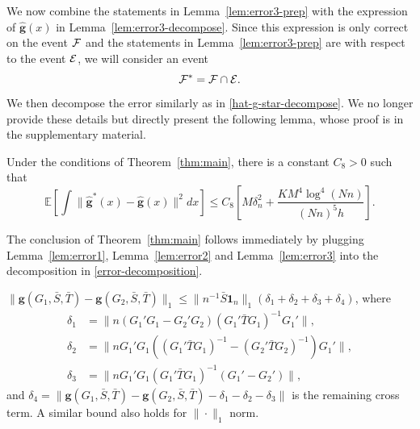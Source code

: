 \documentclass[preprint,11pt]{article}
\newcommand{\mbb}{\mathbb}
\newcommand{\mbf}{\mathbf}
\newcommand{\bg}{{\boldsymbol g}}
\numberwithin{equation}{section}
\begin{document}
We now combine the statements in Lemma~\ref{lem:error3-prep} with the expression of $\widehat{\bg}(x)$ in Lemma~\ref{lem:error3-decompose}. 
Since this expression is only correct on the event ${\cal F}$ and the statements in Lemma~\ref{lem:error3-prep} are with respect to the event ${\cal E}$, we will consider an event 
\[
{\cal F}^* = {\cal F}\cap {\cal E}. 
\] 
We then decompose the error similarly as in  \eqref{hat-g-star-decompose}. We no longer provide these details but directly present the following lemma, whose proof is in the supplementary material. 
\begin{lemma} \label{lem:error3}
Under the conditions of Theorem~\ref{thm:main}, there is a constant $C_8>0$ such that
\[
    \mbb{E}\left[\int \|\widehat{\bm{g}}^*(x)-\widehat{\bm{g}}(x)\|^2dx\right]\le C_8\left[M\delta_n^2+\frac{KM^4\log^4(Nn)}{(Nn)^5h}\right].
\]
\end{lemma}

The conclusion of Theorem~\ref{thm:main} follows immediately by plugging Lemma~\ref{lem:error1}, Lemma~\ref{lem:error2} and Lemma~\ref{lem:error3} into the decomposition in \eqref{error-decomposition}. 



\iffalse
\begin{lemma}\label{lem:error31}
$\|\bg(G_1, \bar{S}, \bar{T})-\bg(G_2, \bar{S}, \bar{T})\|_1\leq \|n^{-1}\bar{S}\mbf{1}_n\|_1\left(\delta_1+\delta_2+\delta_3+\delta_{4}\right)$,
where 
\begin{align*}
    \delta_1&=\|n(G_1'G_1-G_2'G_2)(G_1'\bar{T}G_1)^{-1}G_1'\|,\\
    \delta_2&=\|nG_1'G_1((G_1'\bar{T}G_1)^{-1}-(G_2'\bar{T}G_2)^{-1})G_1'\|,\\
    \delta_3&=\|nG_1'G_1(G_1'\bar{T}G_1)^{-1}(G_1'-G_2')\|,
\end{align*}
and $\delta_4=\|\bg(G_1, \bar{S}, \bar{T})-\bg(G_2, \bar{S}, \bar{T})-\delta_1-\delta_2-\delta_3\|$ is the remaining cross term. A similar bound also holds for $\|\cdot\|_1$ norm.
\end{lemma}
\end{document}
